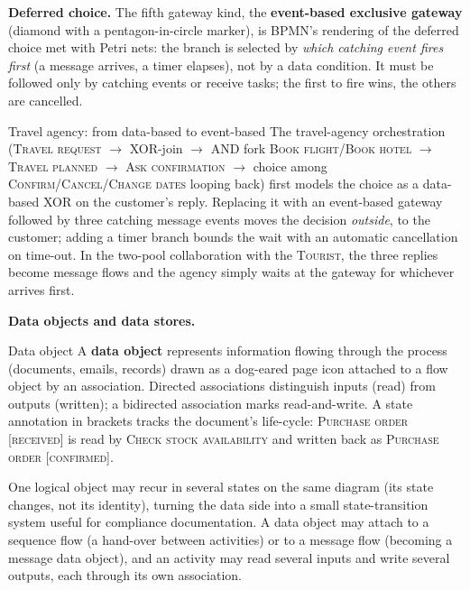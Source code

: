 \textbf{Deferred choice.} The fifth gateway kind, the \textbf{event-based exclusive gateway} (diamond with a pentagon-in-circle marker), is BPMN's rendering of the deferred choice met with Petri nets: the branch is selected by \emph{which catching event fires first} (a message arrives, a timer elapses), not by a data condition. It must be followed only by catching events or receive tasks; the first to fire wins, the others are cancelled.

\begin{examplebox}{Travel agency: from data-based to event-based}
The travel-agency orchestration (\textsc{Travel request} $\to$ XOR-join $\to$ AND fork \textsc{Book flight}/\textsc{Book hotel} $\to$ \textsc{Travel planned} $\to$ \textsc{Ask confirmation} $\to$ choice among \textsc{Confirm}/\textsc{Cancel}/\textsc{Change dates} looping back) first models the choice as a data-based XOR on the customer's reply. Replacing it with an event-based gateway followed by three catching message events moves the decision \emph{outside}, to the customer; adding a timer branch bounds the wait with an automatic cancellation on time-out. In the two-pool collaboration with the \textsc{Tourist}, the three replies become message flows and the agency simply waits at the gateway for whichever arrives first.
\end{examplebox}

\textbf{Data objects and data stores.}
\begin{definitionbox}{Data object}
A \textbf{data object} represents information flowing through the process (documents, emails, records) drawn as a dog-eared page icon attached to a flow object by an association. Directed associations distinguish inputs (read) from outputs (written); a bidirected association marks read-and-write. A state annotation in brackets tracks the document's life-cycle: \textsc{Purchase order [received]} is read by \textsc{Check stock availability} and written back as \textsc{Purchase order [confirmed]}.
\end{definitionbox}

One logical object may recur in several states on the same diagram (its state changes, not its identity), turning the data side into a small state-transition system useful for compliance documentation. A data object may attach to a sequence flow (a hand-over between activities) or to a message flow (becoming a message data object), and an activity may read several inputs and write several outputs, each through its own association.

